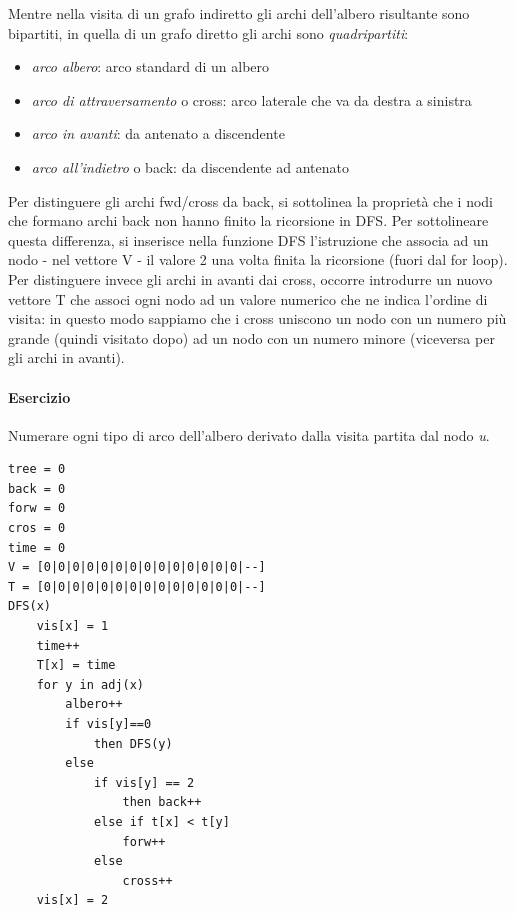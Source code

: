 Mentre nella visita di un grafo indiretto gli archi dell'albero risultante sono bipartiti, in quella di un grafo diretto gli archi sono \textit{quadripartiti}:
\begin{itemize}
	\item \textit{arco albero}: arco standard di un albero
	\item \textit{arco di attraversamento} o cross: arco laterale che va da destra a sinistra
	\item \textit{arco in avanti}: da antenato a discendente
	\item \textit{arco all'indietro} o back: da discendente ad antenato
\end{itemize} 
Per distinguere gli archi fwd/cross da back, si sottolinea la proprietà che i nodi che formano archi back non hanno finito la ricorsione in DFS.
Per sottolineare questa differenza, si inserisce nella funzione DFS l'istruzione che associa ad un nodo - nel vettore V - il valore 2 una volta finita la ricorsione (fuori dal for loop).\\
Per distinguere invece gli archi in avanti dai cross, occorre introdurre un nuovo vettore T che associ ogni nodo ad un valore numerico che ne indica l'ordine di visita: in questo modo sappiamo che i cross uniscono un nodo con un numero più grande (quindi visitato dopo) ad un nodo con un numero minore (viceversa per gli archi in avanti).
\paragraph{Esercizio}
Numerare ogni tipo di arco dell'albero derivato dalla visita partita dal nodo \textit{u}.\\
\begin{lstlisting}
tree = 0
back = 0
forw = 0
cros = 0
time = 0
V = [0|0|0|0|0|0|0|0|0|0|0|0|0|0|--]
T = [0|0|0|0|0|0|0|0|0|0|0|0|0|0|--]
DFS(x)
	vis[x] = 1 
	time++
	T[x] = time
	for y in adj(x)
		albero++
		if vis[y]==0
			then DFS(y)
		else
			if vis[y] == 2
				then back++
			else if t[x] < t[y]
				forw++
			else
				cross++
	vis[x] = 2
\end{lstlisting}
\newpage

